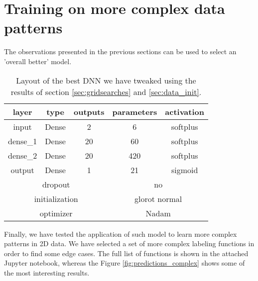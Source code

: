 \section{Training on more complex data patterns}
\label{sec:more_patterns}

The observations presented in the previous sections can be used to select an 'overall better' model.

\begin{table}[h]
\begin{tabular}{ccccc}
\hline\hline layer    & type    & outputs & parameters & activation\\ \hline
input    & Dense   & 2       & 6     & softplus \\
dense\_1 & Dense   & 20      & 60    & softplus \\
dense\_2 & Dense   & 20      & 420   & softplus \\
output   & Dense   & 1       & 21    & sigmoid  \\ \hline\hline
\multicolumn{3}{c}{dropout}  & \multicolumn{2}{c}{no} \\
\multicolumn{3}{c}{initialization}  & \multicolumn{2}{c}{glorot normal} \\
\multicolumn{3}{c}{optimizer}  & \multicolumn{2}{c}{Nadam} \\ \hline\hline
\end{tabular}
\caption{\label{tab:best_model}Layout of the best DNN we have tweaked using the results of section \ref{sec:gridsearches} and \ref{sec:data_init}.}
\end{table}

Finally, we have tested the application of such model to learn more complex patterns in 2D data. We have selected a set of more complex labeling functions in order to find some edge cases. The full list of functions is shown in the attached Jupyter notebook, whereas the Figure \ref{fig:predictions_complex} shows some of the most interesting results.

